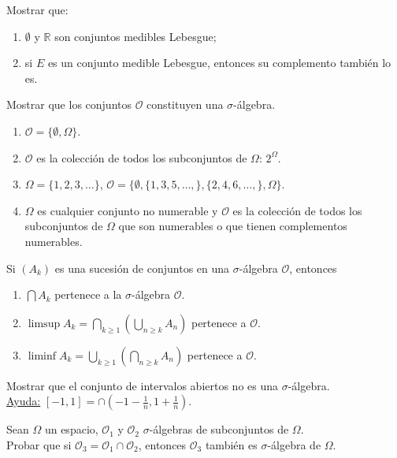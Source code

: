 \documentclass{book}
\newcommand{\rr}{\mathbb{R}}
\begin{document}
\begin{ejer}{} Mostrar que: 
\begin{enumerate}
\item $\emptyset$ y $\rr$ son conjuntos medibles Lebesgue; 
\item si $E$ es un conjunto medible Lebesgue, entonces su complemento tambi\'en lo es.
\end{enumerate}
\end{ejer} 

\begin{ejer}{} 
Mostrar que los conjuntos $ \mathcal{O}$ constituyen una $\sigma$-\'algebra.
\begin{enumerate}
\item $\mathcal{O}=\{\emptyset, \Omega\}$.
\item $\mathcal{O}$ es la colecci\'on de todos los subconjuntos de $\Omega$: $2^{\Omega}$.
\item $\Omega=\{1,2,3,\dots\}$, $\mathcal{O}=\{\emptyset,\{1,3,5,\dots,\},\{2,4,6,\dots,\},\Omega\}$.
\item $\Omega$ es cualquier conjunto no numerable y $\mathcal{O}$ es la colecci\'on de todos los subconjuntos
de $\Omega$ que son numerables o que tienen complementos numerables.
\end{enumerate}
\end{ejer} 


\begin{ejer}{} 
Si $(A_k)$ es una sucesi\'on de conjuntos en una $\sigma$-\'algebra $\mathcal{O}$, entonces
\begin{enumerate}
\item $\bigcap A_k$ pertenece a la $\sigma$-\'algebra $\mathcal{O}$.
\item $\limsup A_k=\bigcap\limits_{k\geq 1}\left(\bigcup\limits_{n\geq k} A_n\right)$ pertenece a $\mathcal{O}$.
\item $\liminf A_k=\bigcup\limits_{k\geq 1}\left(\bigcap\limits_{n\geq k} A_n\right)$ pertenece a $\mathcal{O}$.
 \end{enumerate}
 \end{ejer}  

\begin{ejer}{} 
Mostrar que el conjunto de intervalos abiertos no es una $\sigma$-\'algebra.
\\
\underline{Ayuda:} $[-1,1]=\cap \left(-1-\frac{1}{n},1+\frac{1}{n}\right)$. 
\end{ejer} 

\begin{ejer} 
Sean $\Omega$ un espacio, $\mathcal{O}_1$ y  $\mathcal{O}_2$ $\sigma$-\'algebras de subconjuntos de 
$\Omega$. \\
Probar que si $\mathcal{O}_3=\mathcal{O}_1\cap \mathcal{O}_2$, entonces $\mathcal{O}_3$ 
tambi\'en es $\sigma$-\'algebra de $\Omega$. 
\end{ejer} 
\end{document}
